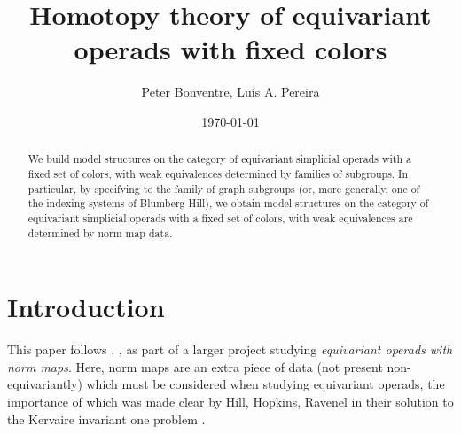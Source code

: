 \documentclass[a4paper,10pt
,draft
]{article}%
\title{Homotopy theory of equivariant operads with fixed colors}
\author{Peter Bonventre, Lu\'is A. Pereira}%
\date{\today}
\numberwithin{equation}{section}
\numberwithin{figure}{section}
\theoremstyle{definition} %
\newcommand{\1}{\ensuremath{\mathbbm 1}}%
\begin{document}
\maketitle

\begin{abstract}
	We build model structures 
	on the category of equivariant simplicial operads with a fixed set of colors,
	with weak equivalences determined by families of subgroups.
	In particular, by specifying to the family of graph subgroups 
	(or, more generally, one of the indexing systems of Blumberg-Hill),
	we obtain model structures on the category of equivariant simplicial operads with a fixed set of colors,
	with weak equivalences are determined by norm map data.
\end{abstract}



\tableofcontents







\section{Introduction}

This paper follows \cite{Per18}, \cite{BP_geo}, \cite{BP_edss}
as part of a larger project studying 
\emph{equivariant operads with norm maps}.
Here, norm maps are an extra piece of data 
(not present non-equivariantly)
which must be considered
when studying equivariant operads,
the importance of which was made clear by
Hill, Hopkins, Ravenel 
in their solution to the Kervaire invariant one problem \cite{HHR16}.
\end{document}
